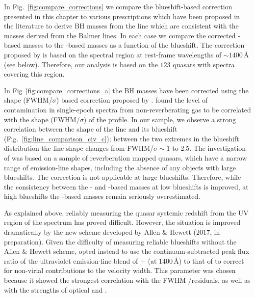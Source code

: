 In Fig.~\ref{fig:compare_corrections} we compare the  blueshift-based correction presented in this chapter to various prescriptions which have been proposed in the literature to derive BH masses from the  line which are consistent with the masses derived from the Balmer lines. 
In each case we compare the corrected -based masses to the \hans-based masses as a function of the  blueshift. 
The correction proposed by \citet{runnoe13} is based on the spectral region at rest-frame wavelengths of $\sim$$1400$\,\AA\, (see below). 
Therefore, our analysis is based on the $123$ quasars with spectra covering this region. 

In Fig~\ref{fig:compare_corrections_a} the  BH masses have been corrected using the  shape (FWHM/$\sigma$) based correction proposed by \citet{denney12}. 
\citet{denney12} found the level of contamination in single-epoch spectra from non-reverberating gas to be correlated with the shape (FWHM/$\sigma$) of the  profile. 
In our sample, we observe a strong correlation between the shape of the  line and its blueshift (Fig.~\ref{fig:line_comparison_civ_c}); between the two extremes in the  blueshift distribution the line shape changes from FWHM/$\sigma\sim1$ to $2.5$. 
The investigation of \citet{denney12} was based on a sample of reverberation mapped quasars, which have a narrow range of  emission-line shapes, including the absence of any objects with large  blueshifts. 
The correction is not applicable at large  blueshifts. 
Therefore, while the consistency between the \hans- and -based masses at low  blueshifts is improved, at high  blueshifts the -based masses remain seriously overestimated.

As explained above, reliably measuring the quasar systemic redshift from the UV region of the spectrum has proved difficult. 
However, the situation is improved dramatically by the new scheme developed by Allen \& Hewett (2017, in preparation). 
Given the difficulty of measuring reliable  blueshifts without the Allen \& Hewett scheme, \citet{runnoe13} opted instead to use the continuum-subtracted peak flux ratio of the ultraviolet emission-line blend of + (at $1400$\,\AA) to that of  to correct for non-virial contributions to the  velocity width. 
This parameter was chosen because it showed the strongest correlation with the FWHM /\hb residuals, as well as with the strengths of optical  and . 

